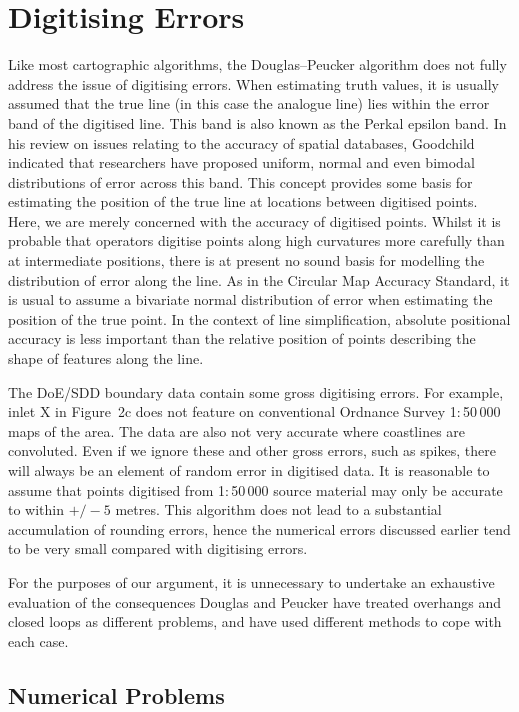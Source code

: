 \documentclass{egpubl}
\begin{document}
\section{Digitising Errors}
\label{sec:digErr}

Like most cartographic algorithms, the Douglas--Peucker algorithm does not
fully address the issue of digitising errors. When estimating truth values,
it is usually assumed that the true line (in this case the analogue line)
lies within the error band of the digitised line. This band is also known as
the Perkal epsilon band. In his review on issues relating to the accuracy of
spatial databases, Goodchild\cite{Lev90} indicated that researchers have
proposed uniform, normal and even bimodal distributions of error across this
band. This concept provides some basis for estimating the position of the
true line at locations between digitised points. Here, we are merely
concerned with the accuracy of digitised points. Whilst it is probable that
operators digitise points along high curvatures more carefully than at
intermediate positions, there is at present no sound basis for modelling the
distribution of error along the line. As in the Circular Map Accuracy
Standard, it is usual to assume a bivariate normal distribution of error when
estimating the position of the true point. In the context of line
simplification, absolute positional accuracy is less important than the
relative position of points describing the shape of features along the line.

The DoE/SDD boundary data contain some gross digitising errors. For example,
inlet X in Figure~2c does not feature on conventional Ordnance Survey
1:\,50\,000 maps of the area. The data are also not very accurate where
coastlines are convoluted. Even if we ignore these and other gross errors,
such as spikes, there will always be an element of random error in digitised
data. It is reasonable to assume that points digitised from 1:\,50\,000
source material may only be accurate to within $+/-5$ metres. This algorithm
does not lead to a substantial accumulation of rounding errors, hence the
numerical errors discussed earlier tend to be very small compared with
digitising errors.

For the purposes of our argument, it is unnecessary to undertake an
exhaustive evaluation of the consequences Douglas and Peucker have treated
overhangs and closed loops as different problems, and have used different
methods to cope with each case.

\subsection{Numerical Problems}
\end{document}
